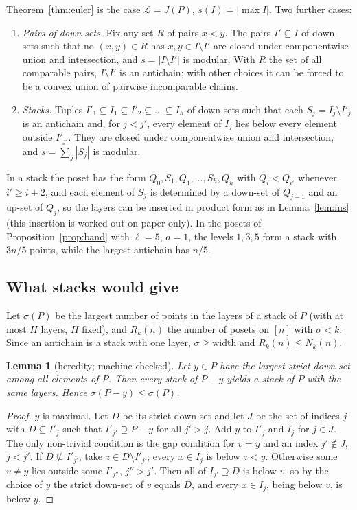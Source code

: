 \documentclass[11pt]{article}
\newtheorem{lemma}[theorem]{Lemma}
\theoremstyle{definition}
\theoremstyle{remark}
\begin{document}
Theorem~\ref{thm:euler} is the case $\mathcal L=J(P)$, $s(I)=|\max I|$. Two further cases:

\begin{enumerate}
\item \emph{Pairs of down-sets.} Fix any set $R$ of pairs $x<y$. The pairs $I'\subseteq I$
of down-sets such that no $(x,y)\in R$ has $x,y\in I\setminus I'$ are closed under
componentwise union and intersection, and $s=|I\setminus I'|$ is modular. With $R$ the set
of all comparable pairs, $I\setminus I'$ is an antichain; with other choices it can be forced
to be a convex union of pairwise incomparable chains.
\item \emph{Stacks.} Tuples $I'_1\subseteq I_1\subseteq I'_2\subseteq\dots\subseteq I_h$ of
down-sets such that each $S_j=I_j\setminus I'_j$ is an antichain and, for $j<j'$, every
element of $I_j$ lies below every element outside $I'_{j'}$. They are closed under
componentwise union and intersection, and $s=\sum_j|S_j|$ is modular.
\end{enumerate}

In a stack the poset has the form $Q_0,S_1,Q_1,\dots,S_h,Q_h$ with $Q_i<Q_{i'}$ whenever
$i'\ge i+2$, and each element of $S_{j}$ is determined by a down-set of $Q_{j-1}$ and an
up-set of $Q_j$, so the layers can be inserted in product form as in
Lemma~\ref{lem:ins} (this insertion is worked out on paper only). In the posets of
Proposition~\ref{prop:band} with $\ell=5$, $a=1$, the levels $1,3,5$ form a stack with
$3n/5$ points, while the largest antichain has $n/5$.

\subsection*{What stacks would give}

Let $\sigma(P)$ be the largest number of points in the layers of a stack of $P$ (with at
most $H$ layers, $H$ fixed), and $R_k(n)$ the number of posets on $[n]$ with $\sigma<k$.
Since an antichain is a stack with one layer, $\sigma\ge\mathrm{width}$ and
$R_k(n)\le N_k(n)$.

\begin{lemma}[heredity; machine-checked]\label{lem:hered}
Let $y\in P$ have the largest strict down-set among all elements of $P$. Then every stack of
$P-y$ yields a stack of $P$ with the same layers. Hence $\sigma(P-y)\le\sigma(P)$.
\end{lemma}
\begin{proof}
$y$ is maximal. Let $D$ be its strict down-set and let $J$ be the set of indices $j$ with
$D\subseteq I'_j$ such that $I'_{j'}\supseteq P-y$ for all $j'>j$. Add $y$ to $I'_j$ and
$I_j$ for $j\in J$. The only non-trivial condition is the gap condition for $v=y$ and an
index $j'\notin J$, $j<j'$. If $D\not\subseteq I'_{j'}$, take $z\in D\setminus I'_{j'}$;
every $x\in I_j$ is below $z<y$. Otherwise some $v\ne y$ lies outside some $I'_{j''}$,
$j''>j'$. Then all of $I_{j'}\supseteq D$ is below $v$, so by the choice of $y$ the strict
down-set of $v$ equals $D$, and every $x\in I_j$, being below $v$, is below $y$.
\end{proof}
\end{document}
